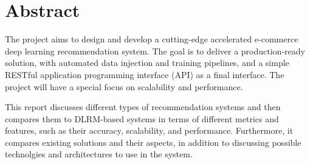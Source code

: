 \cleardoublepage {} {} \mtcaddchapter
\chapter*{Abstract}
The project aims to design and develop a cutting-edge accelerated e-commerce deep learning recommendation system. The goal is to deliver a production-ready solution, with automated data injection and training pipelines, and a simple RESTful application programming interface (API) as a final interface. The project will have a special focus on scalability and performance.

This report discusses different types of recommendation systems and then compares them to DLRM-based systems in terms of different metrics and features, such as their accuracy, scalability, and performance.
Furthermore, it compares existing solutions and their aspects, in addition to discussing possible technolgies and architectures to use in the system.


\justifying